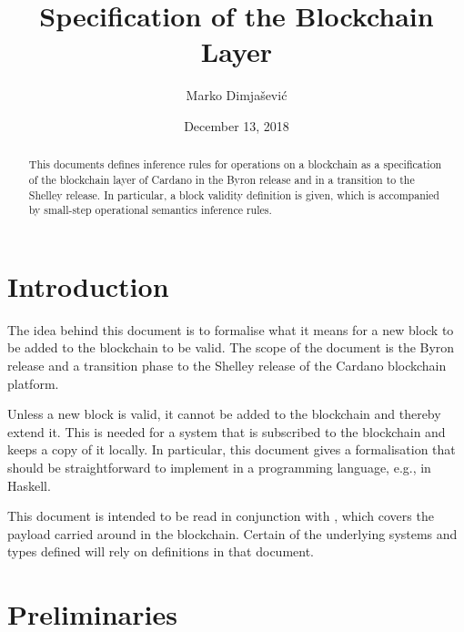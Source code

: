\documentclass[11pt,a4paper]{article}
\begin{document}
\title{Specification of the Blockchain Layer}

\author{Marko Dimjašević}

\date{December 13, 2018}

\maketitle

\begin{abstract}
  This documents defines inference rules for operations on a blockchain as a
  specification of the blockchain layer of Cardano in the Byron release and in
  a transition to the Shelley release.
  In particular, a block validity definition is given, which is accompanied by
  small-step operational semantics inference rules.
\end{abstract}

\tableofcontents
\listoffigures

\section{Introduction}
\label{sec:introduction}

The idea behind this document is to formalise what it means for a new block to
be added to the blockchain to be valid.
%
The scope of the document is the Byron release and a transition phase to the
Shelley release of the Cardano blockchain platform.


Unless a new block is valid, it cannot be added to the blockchain and thereby
extend it.
%
This is needed for a system that is subscribed to the blockchain and keeps a
copy of it locally.
%
In particular, this document gives a formalisation that should be
straightforward to implement in a programming language, e.g., in Haskell.

This document is intended to be read in conjunction with \cite{ledger-spec},
which covers the payload carried around in the blockchain. Certain of the
underlying systems and types defined will rely on definitions in that document.

\section{Preliminaries}
\label{sec:preliminaries}
\end{document}
